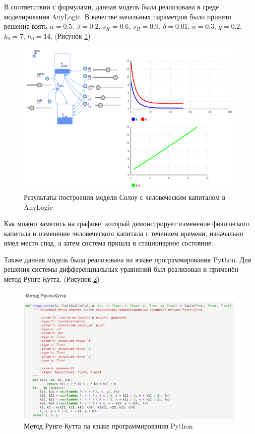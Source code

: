 \documentclass[14pt,fleqn]{extarticle}
\begin{document}
	\newpage
	В соответствии с формулами, данная модель была реализована в среде моделирования AnyLogic. В качестве начальных параметров было принято решение взять $\alpha = 0.5$, $\beta = 0.2$, $s_K = 0.6$, $s_H = 0.9$, $\delta = 0.01$, $n = 0.3$, $g = 0.2$, $k_0 = 7$, $h_0 = 14$. (Рисунок \ref{fig:M-R-W_anylogic})
	\begin{figure}[h]
		\centering \includegraphics[scale=0.3]{M-R-W_anylogic}
		\caption{Результаты построения модели Солоу с человеческим капиталом в AnyLogic}
		\label{fig:M-R-W_anylogic}
	\end{figure}
	
	Как можно заметить на графике, который демонстрирует изменение физического капитала и изменение человеческого капитала с течением времени, изначально имел место спад, а затем система пришла в стационарное состояние.
	
	\newpage
	Также данная модель была реализована на языке программирования Python. Для решения системы дифференциальных уравнений был реализован и применён метод Рунге-Кутта. (Рисунок \ref{fig:M-R-W_runge_kutta})
	\begin{figure}[h]
		\centering \includegraphics[scale=0.5]{M-R-W_runge_kutta}
		\caption{Метод Рунге-Кутта на языке программирования Python}
		\label{fig:M-R-W_runge_kutta}
	\end{figure}
	
\end{document}
